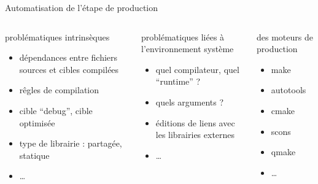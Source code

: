 \documentclass[9pt]{beamer}
\begin{document}
\begin{frame}{Automatisation de l'étape de production}
\begin{columns}[t]
\begin{block}{problématiques intrinsèques}
  \begin{itemize}
  \item dépendances entre fichiers sources et cibles compilées
  \item rêgles de compilation
  \item cible ``debug'', cible optimisée
  \item type de librairie : partagée, statique
  \item \dots
  \end{itemize}
\end{block}
\begin{block}{problématiques liées à l'environnement système}
  \begin{itemize}
  \item quel compilateur, quel ``runtime'' ?
  \item quels arguments ?
  \item éditions de liens avec les librairies externes
  \item \dots
  \end{itemize}
\end{block}
\begin{block}{des moteurs de production}
  \begin{itemize}
  \item make
  \item autotools
  \item cmake
  \item scons
  \item qmake
  \item \dots
  \end{itemize}
\end{block}
\end{columns}

\end{frame}
\end{document}
